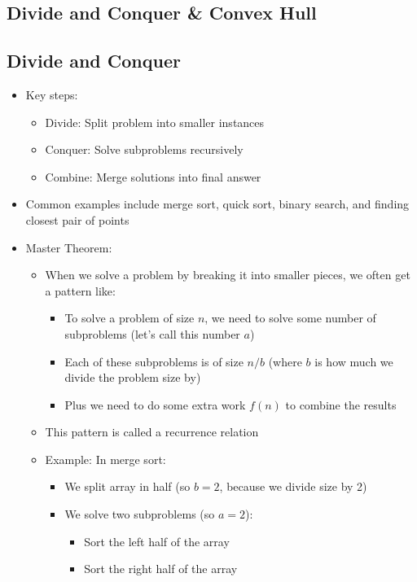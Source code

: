 \documentclass[11pt,a4paper]{article}
\begin{document}
\begin{multicols}{2}
\section{Divide and Conquer \& Convex Hull}
\subsection{Divide and Conquer}
\begin{itemize}
    \item Key steps:
    \begin{itemize}
        \item Divide: Split problem into smaller instances
        \item Conquer: Solve subproblems recursively
        \item Combine: Merge solutions into final answer
    \end{itemize}
    \item Common examples include merge sort, quick sort, binary search, and finding closest pair of points
    \item Master Theorem:
    \begin{itemize}
        \item When we solve a problem by breaking it into smaller pieces, we often get a pattern like:
        \begin{itemize}
            \item To solve a problem of size $n$, we need to solve some number of subproblems (let's call this number $a$)
            \item Each of these subproblems is of size $n/b$ (where $b$ is how much we divide the problem size by)
            \item Plus we need to do some extra work $f(n)$ to combine the results
        \end{itemize}
        \item This pattern is called a recurrence relation
        \item Example: In merge sort:
        \begin{itemize}
            \item We split array in half (so $b = 2$, because we divide size by 2)
            \item We solve two subproblems (so $a = 2$):
            \begin{itemize}
                \item Sort the left half of the array
                \item Sort the right half of the array

\end{itemize}
\end{itemize}
\end{itemize}
\end{itemize}
\end{multicols}
\end{document}
